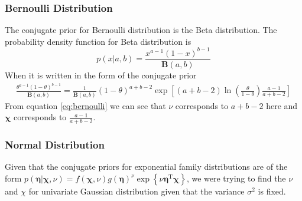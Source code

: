 \documentclass[12pt]{article}
\begin{document}
\subsubsection{Bernoulli Distribution}
The conjugate prior for Bernoulli distribution is the Beta distribution. The probability density function for Beta distribution is
\begin{equation}\label{eq:beta}
    p(x| a,b)=\frac{x^{a-1}(1-x)^{b-1}}{\mathbf{B}(a, b)}
\end{equation}
When it is written in the form of the conjugate prior
\begin{equation}\label{eq:bernoulli}
    \begin{split}
        \frac{\theta^{a-1}(1-\theta)^{b-1}}{\mathbf{B}(a, b)}
        =\frac{1}{\mathbf{B}(a, b)}(1-\theta)^{a+b-2}\exp\left[ (a+b-2)\ln\left( \frac{\theta}{1-\theta} \right)\frac{a-1}{a+b-2} \right]
    \end{split}
\end{equation}
From equation \ref{eq:bernoulli} we can see that $\nu$ corresponds to $a+b-2$ here and $\bm{\chi}$ corresponds to $\frac{a-1}{a+b-2}$.
\subsubsection{Normal Distribution}
Given that the conjugate priors for exponential family distributions are of the form $p(\boldsymbol{\eta} | \boldsymbol{\chi}, \nu)=f(\boldsymbol{\chi}, \nu) g(\boldsymbol{\eta})^{\nu} \exp \left\{\nu \boldsymbol{\eta}^{\mathrm{T}} \boldsymbol{\chi}\right\}$, we were trying to find the $\nu$ and $\chi$ for univariate Gaussian distribution given that the variance $\sigma^2$ is fixed.
\end{document}
